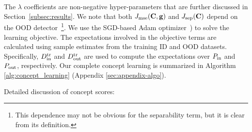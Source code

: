 The $\lambda$ coefficients are non-negative hyper-parameters that are further discussed in Section~\ref{subsec:results}.
We note that both $J_{\textrm{mse}}(\mathbf{C}, \mathbf{g})$ and $J_{\textrm{sep}}(\mathbf{C})$ depend on the OOD detector~\footnote{This dependence may not be obvious for the separability term, but it is clear from its definition.}.
We use the SGD-based Adam optimizer~\citep{kingma2014adam}) to solve the learning objective.
The expectations involved in the objective terms are calculated using sample estimates from the training ID and OOD datasets. 
Specifically, $D_{\textrm{in}}^{\textrm{tr}}$ and $D_{\textrm{out}}^{\textrm{tr}}$ are used to compute the expectations over $P_{\textrm{in}}$ and $P_{\textrm{out}}$, respectively.
Our complete concept learning is summarized in Algorithm \ref{alg:concept_learning} (Appendix \ref{sec:appendix-algo}).



\iffalse

Detailed discussion of concept scores:

